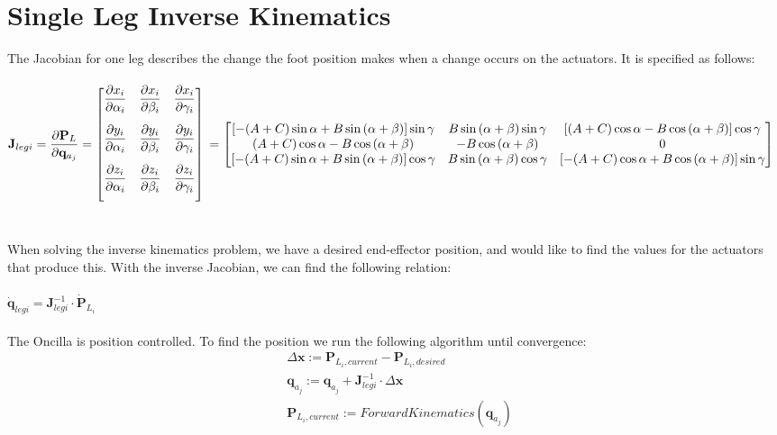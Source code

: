 \documentclass[a4paper,10pt]{article}
\begin{document}
\newpage
\section{Single Leg Inverse Kinematics}
The Jacobian for one leg describes the change the foot position makes when a change occurs on the actuators. It is specified as follows:\\
\\
$
\mathbf{J}_{legi} = \dfrac{\partial\mathbf{P}_{L}}{\partial{\mathbf{q}_{a_{j}}}} = \begin{bmatrix}
  \dfrac{\partial{x_i}}{\partial{\alpha_i}} & \dfrac{\partial{x_i}}{\partial{\beta_i}} & \dfrac{\partial{x_i}}{\partial{\gamma_i}} \\[5mm]
  \dfrac{\partial{y_i}}{\partial{\alpha_i}} & \dfrac{\partial{y_i}}{\partial{\beta_i}} & \dfrac{\partial{y_i}}{\partial{\gamma_i}} \\[5mm]
  \dfrac{\partial{z_i}}{\partial{\alpha_i}} & \dfrac{\partial{z_i}}{\partial{\beta_i}} & \dfrac{\partial{z_i}}{\partial{\gamma_i}} \\[5mm]
\end{bmatrix}
\vspace{5mm}
\\
= \begin{bmatrix}
  [-(A+C)\sin\alpha + B\sin{(\alpha+\beta)}]\sin\gamma & B\sin{(\alpha+\beta)}\sin\gamma & [(A+C)\cos\alpha - B\cos{(\alpha+\beta)}]\cos\gamma\\
  (A+C)\cos\alpha - B\cos{(\alpha+\beta)} & -B\cos{(\alpha+\beta)} & 0 \\ 
  [-(A+C)\sin\alpha + B\sin{(\alpha+\beta)}]\cos\gamma & B\sin{(\alpha+\beta)}\cos\gamma & [-(A+C)\cos\alpha + B\cos{(\alpha+\beta)}]\sin\gamma\\
\end{bmatrix} 
$\\
\\\\
When solving the inverse kinematics problem, we have a desired end-effector position, and would like to find the values for the actuators that produce this. With the inverse Jacobian, we can find the following relation: \\
\\
$
\dot{\mathbf{q}}_{legi} = {\mathbf{J}^{-1}_{legi}}\cdot\dot{\mathbf{P}}_{L_{i}} 
$
\\\\
The Oncilla is position controlled. To find the position we run the following algorithm until convergence:
\begin{eqnarray}
&\Delta{\mathbf{x}} := \mathbf{P}_{L_i,current} - \mathbf{P}_{L_i,desired}\\
&\mathbf{q}_{a_j} := \mathbf{q}_{a_j} + \mathbf{J}^{-1}_{legi}\cdot\Delta{\mathbf{x}}\\
&\mathbf{P}_{L_i,current} := ForwardKinematics(\mathbf{q}_{a_j})
\end{eqnarray}
\end{document}
